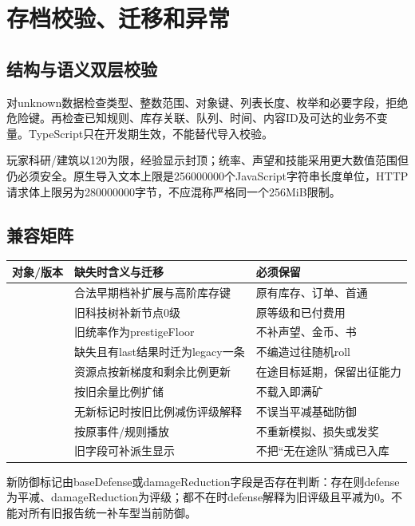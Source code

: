 \chapter{存档校验、迁移和异常}
\section{结构与语义双层校验}
对unknown数据检查类型、整数范围、对象键、列表长度、枚举和必要字段，拒绝危险键。再检查已知规则、库存关联、队列、时间、内容ID及可达的业务不变量。TypeScript只在开发期生效，不能替代导入校验。

玩家科研/建筑以120为限，经验显示封顶；统率、声望和技能采用更大数值范围但仍必须安全。原生导入文本上限是256000000个JavaScript字符串长度单位，HTTP请求体上限另为280000000字节，不应混称严格同一个256MiB限制。

\section{兼容矩阵}
\begin{small}\begin{longtable}{@{}P{35mm}P{54mm}P{55mm}@{}}
\toprule 对象/版本 & 缺失时含义与迁移 & 必须保留\\\midrule\endhead
{} & 合法早期档补扩展与高阶库存键 & 原有库存、订单、首通\\
 & 旧科技树补新节点0级 & 原等级和已付费用\\
 & 旧统率作为prestigeFloor & 不补声望、金币、书\\
 & 缺失且有last结果时迁为legacy一条 & 不编造过往随机roll\\
 & 资源点按新梯度和剩余比例更新 & 在途目标延期，保留出征能力\\
 & 按旧余量比例扩储 & 不载入即满矿\\
 & 无新标记时按旧比例减伤评级解释 & 不误当平减基础防御\\
 & 按原事件/规则播放 & 不重新模拟、损失或发奖\\
 & 旧字段可补派生显示 & 不把“无在途队”猜成已入库\\
\bottomrule\end{longtable}\end{small}

新防御标记由baseDefense或damageReduction字段是否存在判断：存在则defense为平减、damageReduction为评级；都不在时defense解释为旧评级且平减为0。不能对所有旧报告统一补车型当前防御。

